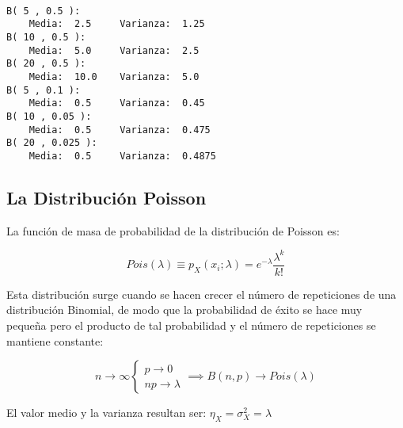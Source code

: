 \documentclass[11pt]{article}
\begin{document}
    \begin{center}
    \end{center}
    { \hspace*{\fill} \\}
    
    \begin{Verbatim}[commandchars=\\\{\}]
B( 5 , 0.5 ):
 	Media:  2.5 	Varianza:  1.25
B( 10 , 0.5 ):
 	Media:  5.0 	Varianza:  2.5
B( 20 , 0.5 ):
 	Media:  10.0 	Varianza:  5.0
B( 5 , 0.1 ):
 	Media:  0.5 	Varianza:  0.45
B( 10 , 0.05 ):
 	Media:  0.5 	Varianza:  0.475
B( 20 , 0.025 ):
 	Media:  0.5 	Varianza:  0.4875

    \end{Verbatim}

    \hypertarget{la-distribuciuxf3n-poisson}{%
\subsection*{La Distribución Poisson}\label{la-distribuciuxf3n-poisson}}

La función de masa de probabilidad de la distribución de Poisson es:

\[Pois(\lambda)\equiv p_X(x_i;\lambda) = e^{-\lambda}\frac{\lambda^k}{k!}\]

Esta distribución surge cuando se hacen crecer el número de repeticiones
de una distribución Binomial, de modo que la probabilidad de éxito se
hace muy pequeña pero el producto de tal probabilidad y el número de
repeticiones se mantiene constante:

\[n \rightarrow \infty \begin{cases}
    p \rightarrow 0\\
    np \rightarrow \lambda
  \end{cases} \implies B(n,p) \rightarrow Pois(\lambda)\]

El valor medio y la varianza resultan ser: \(\eta_X=\sigma_X^2=\lambda\)

    \begin{center}
    \end{center}
    { \hspace*{\fill} \\}
    
\end{document}

